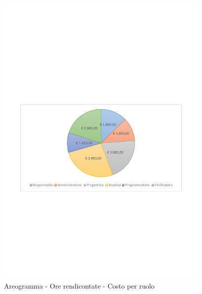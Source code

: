 \documentclass[../PianoProgetto.tex]{subfiles}
\begin{document}
	\begin{figure}[!h]
		\centering
		\includegraphics[width=0.93\textwidth , trim=2cm 9.5cm 2cm 11cm]{grafici/Riepilogo/Rendicontate/costo}
			\caption{Areogramma - Ore rendicontate - Costo per ruolo}
		\label{fig:CircleChart-rendicontate_costo}
	\end{figure}
\vfill	
\end{document}
